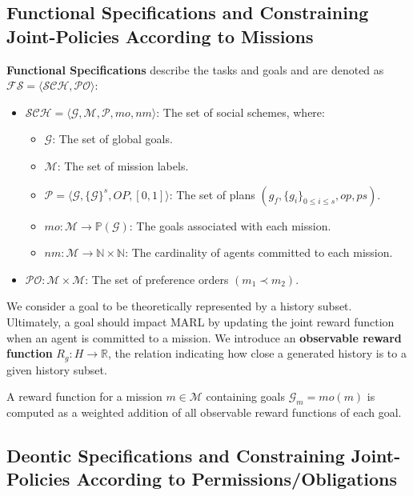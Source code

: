 \documentclass[runningheads]{llncs}
\theoremstyle{freethm}
\theoremstyle{proofoutline}
\newcounter{relation}
\begin{document}
\subsection{Functional Specifications and Constraining Joint-Policies According to Missions}

\textbf{Functional Specifications} describe the tasks and goals and are denoted as $\mathcal{FS} = \langle \mathcal{SCH}, \mathcal{PO} \rangle$:

\begin{itemize}
    \item $\mathcal{SCH} = \langle \mathcal{G}, \mathcal{M}, \mathcal{P}, mo, nm \rangle$: The set of social schemes, where:
          \begin{itemize}
              \item $\mathcal{G}$: The set of global goals.
              \item $\mathcal{M}$: The set of mission labels.
              \item $\mathcal{P} = \langle \mathcal{G}, \{\mathcal{G}\}^s, OP, [0,1] \rangle$: The set of plans $(g_f, \{g_i\}_{0 \leq i \leq s}, op, ps)$.
              \item $mo: \mathcal{M} \rightarrow \mathbb{P}(\mathcal{G})$: The goals associated with each mission.
              \item $nm: \mathcal{M} \rightarrow \mathbb{N} \times \mathbb{N}$: The cardinality of agents committed to each mission.
          \end{itemize}
    \item $\mathcal{PO}: \mathcal{M} \times \mathcal{M}$: The set of preference orders $(m_1 \prec m_2)$.
\end{itemize}

We consider a goal to be theoretically represented by a history subset. Ultimately, a goal should impact MARL by updating the joint reward function when an agent is committed to a mission. We introduce an \textbf{observable reward function} $R_{g}: H \rightarrow \mathbb{R}$, the relation indicating how close a generated history is to a given history subset.

A reward function for a mission $m \in \mathcal{M}$ containing goals $\mathcal{G}_{m} = mo(m)$ is computed as a weighted addition of all observable reward functions of each goal.

\subsection{Deontic Specifications and Constraining Joint-Policies According to Permissions/Obligations}
\end{document}
